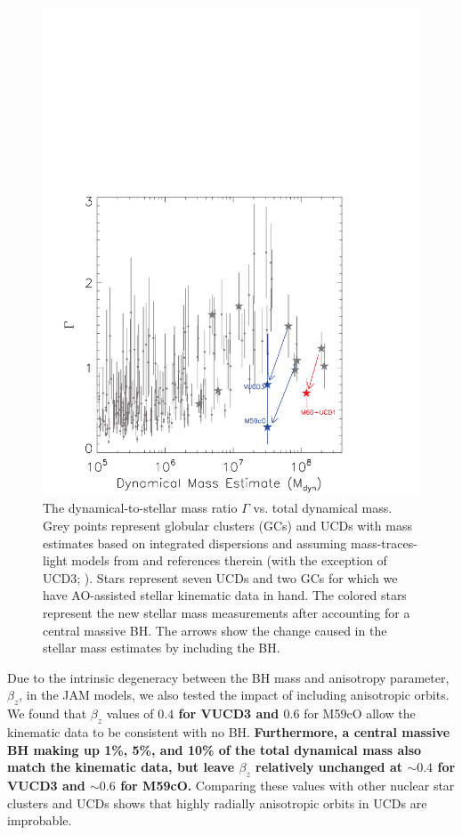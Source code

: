 \documentclass{aastex}
\begin{document}
\begin{figure}[ht!]
  \begin{center}
    \includegraphics[trim={0 0 0 10cm},clip,scale=0.9]{mlratio.pdf}
    \caption{The dynamical-to-stellar mass ratio $\Gamma$ vs. total dynamical mass. Grey points represent globular clusters (GCs) and UCDs with mass estimates based on integrated dispersions and assuming mass-traces-light models from \citet{mieske13} and references therein (with the exception of UCD3; \citealt{frank11}). Stars represent seven UCDs and two GCs for which we have AO-assisted stellar kinematic data in hand. The colored stars represent the new stellar mass measurements after accounting for a central massive BH.  The arrows show the change caused in the stellar mass estimates by including the BH.  }
    \label{fig:bhfrac}
  \end{center}
\end{figure}

Due to the intrinsic degeneracy between the BH mass and anisotropy parameter, $\beta_z$, in the JAM models, we also tested the impact of including anisotropic orbits. We found that $\beta_z$ values of \textbf{$0.4$ for VUCD3 and $0.6$} for M59cO allow the kinematic data to be consistent with no BH. \textbf{Furthermore, a central massive BH making up 1\%, 5\%, and 10\% of the total dynamical mass also match the kinematic data, but leave $\beta_z$ relatively unchanged at $\sim 0.4$ for VUCD3 and $\sim 0.6$ for M59cO.} Comparing these values with other nuclear star clusters and UCDs shows that highly radially anisotropic orbits in UCDs are improbable.
\end{document}
